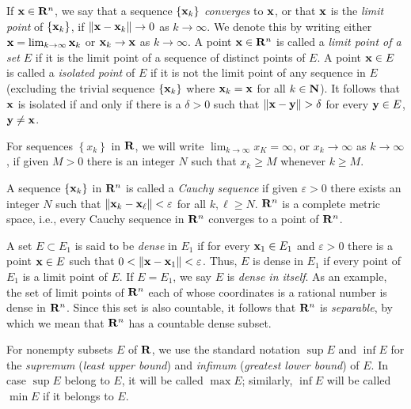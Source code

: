 If $\mathbf{x}\in\mathbf{R}^n$, we say that a sequence $\{\mathbf{x}_k\}$ \emph{converges} to
$\mathbf{x}$, or that $\mathbf{x}$ is the \emph{limit point} of $\{\mathbf{x}_k\}$, if
$\|\mathbf{x}-\mathbf{x}_k\|\to 0$ as $k\to\infty$. We denote this by writing either
$\mathbf{x}=\lim_{k\to\infty}\mathbf{x}_k$ or $\mathbf{x}_k\to\mathbf{x}$ as $k\to\infty$. A point
$\mathbf{x}\in\mathbf{R}^n$ is called a \emph{limit point of a set $E$} if it is the
limit point of a sequence of distinct points of $E$. A point $\mathbf{x}\in E$ is
called a \emph{isolated point} of $E$ if it is not the limit point of any
sequence in $E$ (excluding the trivial sequence $\left\{\mathbf{x}_k\right\}$
where $\mathbf{x}_k=\mathbf{x}$ for all $k\in\mathbf{N}$). It follows that $\mathbf{x}$ is isolated
if and only if there is a $\delta>0$ such that $\|\bfx-\bfy\|>\delta$ for
every $\mathbf{y}\in E$, $\mathbf{y}\neq\mathbf{x}$.

For sequences $\left\{x_k\right\}$ in $\mathbf{R}$, we will write
$\lim_{k\to\infty} x_K=\infty$, or $x_k\to\infty$ as $k\to\infty$, if given
$M>0$ there is an integer $N$ such that $x_k\geq M$ whenever $k\geq M$.

A sequence $\left\{ \mathbf{x}_k \right\}$ in $\mathbf{R}^n$ is called a \emph{Cauchy
  sequence} if given $\varepsilon>0$ there exists an integer $N$ such that
$\|\mathbf{x}_k-\mathbf{x}_\ell\|<\varepsilon$ for all $k,\ell\geq N$. $\mathbf{R}^n$ is a
complete metric space, i.e., every Cauchy sequence in $\mathbf{R}^n$ converges to
a point of $\mathbf{R}^n$.

A set $E\subset E_1$ is said to be \emph{dense} in $E_1$ if for every
$\mathbf{x}_1\in E_1$ and $\varepsilon>0$ there is a point $\mathbf{x}\in E$ such that
$0<\|\mathbf{x}-\mathbf{x}_1\|<\varepsilon$. Thus, $E$ is dense in $E_1$ if every point
of $E_1$ is a limit point of $E$. If $E=E_1$, we say $E$ is \emph{dense in
  itself}. As an example, the set of limit points of $\mathbf{R}^n$ each of whose
coordinates is a rational number is dense in $\mathbf{R}^n$. Since this set is
also countable, it follows that $\mathbf{R}^n$ is \emph{separable}, by which we
mean that $\mathbf{R}^n$ has a countable dense subset.

For nonempty subsets $E$ of $\mathbf{R}$, we use the standard notation $\sup E$
and $\inf E$ for the \emph{supremum} (\emph{least upper bound}) and
\emph{infimum} (\emph{greatest lower bound}) of $E$. In case $\sup E$
belong to $E$, it will be called $\max E$; similarly, $\inf E$ will be
called $\min E$ if it belongs to $E$.

